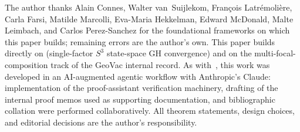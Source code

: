 \documentclass[11pt,a4paper]{article}
\theoremstyle{plain}
\theoremstyle{definition}
\newcommand{\sthree}{S^{3}}
\begin{document}
The author thanks Alain Connes, Walter van~Suijlekom, Fran\c{c}ois
Latr\'emoli\`ere, Carla Farsi, Matilde Marcolli, Eva-Maria Hekkelman,
Edward McDonald, Malte Leimbach, and Carlos Perez-Sanchez for the
foundational frameworks on which this paper builds; remaining errors
are the author's own. This paper builds directly on
\cite{loutey_paper38} (single-factor $\sthree$ state-space GH
convergence) and on the multi-focal-composition track of the GeoVac
internal record. As with~\cite{loutey_paper38}, this work was
developed in an AI-augmented agentic workflow with Anthropic's Claude:
implementation of the proof-assistant verification machinery,
drafting of the internal proof memos used as supporting documentation,
and bibliographic collation were performed collaboratively. All
theorem statements, design choices, and editorial decisions are the
author's responsibility.
\end{document}
